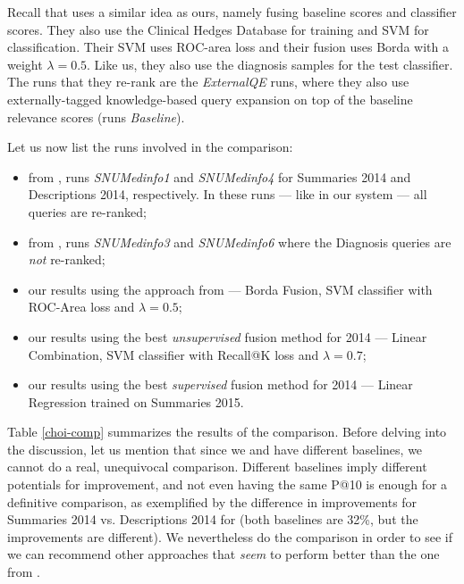 Recall that \cite{choi} uses a similar idea as ours, namely fusing baseline scores and
classifier scores. They also use the Clinical Hedges Database for training and SVM for classification.
Their SVM uses ROC-area loss and their fusion uses Borda with a weight $\lambda=0.5$.
Like us, they also use the diagnosis samples for the test classifier.
The runs that they re-rank are the \emph{ExternalQE} runs, where
they also use externally-tagged knowledge-based query expansion on top of the baseline relevance scores
(runs \emph{Baseline}).

Let us now list the runs involved in the comparison:
\begin{itemize}
 \item from \cite{choi}, runs \emph{SNUMedinfo1} and \emph{SNUMedinfo4} for Summaries 2014 and Descriptions 2014, respectively.
  In these runs --- like in our system --- all queries are re-ranked;
 \item from \cite{choi}, runs \emph{SNUMedinfo3} and \emph{SNUMedinfo6} where the Diagnosis queries are \emph{not} re-ranked;
 \item our results using the approach from \cite{choi} --- Borda Fusion, SVM classifier with ROC-Area loss and $\lambda=0.5$;
 \item our results using the best \emph{unsupervised} fusion method for 2014 --- Linear Combination, SVM classifier with Recall@K loss and $\lambda=0.7$;
 \item our results using the best \emph{supervised} fusion method for 2014 --- Linear Regression trained on Summaries 2015.
\end{itemize}

Table \ref{choi-comp} summarizes the results of the comparison.
Before delving into the discussion, let us mention that since we and \cite{choi} have different baselines,
we cannot do a real, unequivocal comparison. Different baselines imply different potentials for improvement, and
not even having the same P@10 is enough for a definitive comparison, as exemplified by the difference in improvements for Summaries
2014 vs. Descriptions 2014 for \cite{choi} (both baselines are 32\%, but the improvements are different).
We nevertheless do the comparison in order to see if we can recommend other approaches that \emph{seem}
to perform better than the one from \cite{choi}.

